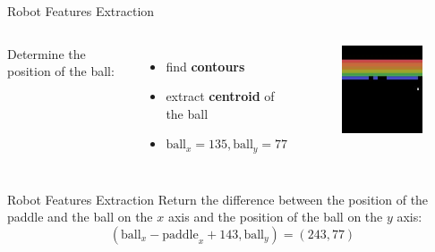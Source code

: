 \begin{frame}{Robot Features Extraction}
    \begin{columns}[c,onlytextwidth]
            Determine the position of the ball:
            \begin{itemize}
                \item find \textbf{contours}
                \item extract \textbf{centroid} of the ball
                \item $\text{ball}_x=135, \text{ball}_y=77$
            \end{itemize}
            \begin{figure}
                \includegraphics[width=\textwidth]{images/robotfeaturesextractorsequence/robotfeatures-bottom-part-ballposition.jpg}
            \end{figure}
    \end{columns}
\end{frame}

\begin{frame}{Robot Features Extraction}
    \justifying
    Return the difference between the position of the paddle and the ball
    on the $x$ axis and the position of the ball on the $y$ axis:
    \begin{equation*}
        (\text{ball}_x - \text{paddle}_x + 143, \text{ball}_y) = (243, 77)
    \end{equation*}
\end{frame}

